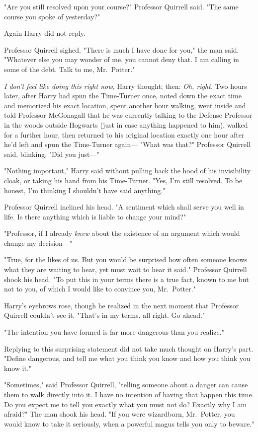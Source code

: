 "Are you still resolved upon your course?" Professor Quirrell said. "The same
course you spoke of yesterday?"

Again Harry did not reply.

Professor Quirrell sighed. "There is much I have done for you," the man said.
"Whatever else you may wonder of me, you cannot deny that. I am calling in some
of the debt. Talk to me, Mr.~Potter."

\emph{I don't feel like doing this right now,} Harry thought; then: \emph{Oh,
right.}
\sbreak
Two hours later, after Harry had spun the Time-Turner once, noted down the
exact time and memorized his exact location, spent another hour walking, went
inside and told Professor McGonagall that he was currently talking to the
Defense Professor in the woods outside Hogwarts (just in case anything happened
to him), walked for a further hour, then returned to his original location
exactly one hour after he'd left and spun the Time-Turner again---
\sbreak
"What was that?" Professor Quirrell said, blinking. "Did you just\mbox{---}"

"Nothing important," Harry said without pulling back the hood of his
invisibility cloak, or taking his hand from his Time-Turner. "Yes, I'm still
resolved. To be honest, I'm thinking I shouldn't have said anything."

Professor Quirrell inclined his head. "A sentiment which shall serve you well
in life. Is there anything which is liable to change your mind?"

"Professor, if I already \emph{knew} about the existence of an argument which
would change my decision\mbox{---}"

"True, for the likes of us. But you would be surprised how often someone knows
what they are waiting to hear, yet must wait to hear it said." Professor
Quirrell shook his head. "To put this in your terms{\el} there is a true
fact, known to me but not to you, of which I would like to convince you,
Mr.~Potter."

Harry's eyebrows rose, though he realized in the next moment that Professor
Quirrell couldn't see it. "That's in my terms, all right. Go ahead."

"The intention you have formed is far more dangerous than you realize."

Replying to this surprising statement did not take much thought on Harry's
part. "Define dangerous, and tell me what you think you know and how you think
you know it."

"Sometimes," said Professor Quirrell, "telling someone about a danger can cause
them to walk directly into it. I have no intention of having that happen this
time. Do you expect me to tell you exactly what you must not do? Exactly why I
am afraid?" The man shook his head. "If you were wizardborn, Mr.~Potter, you
would know to take it seriously, when a powerful magus tells you only to
beware."

